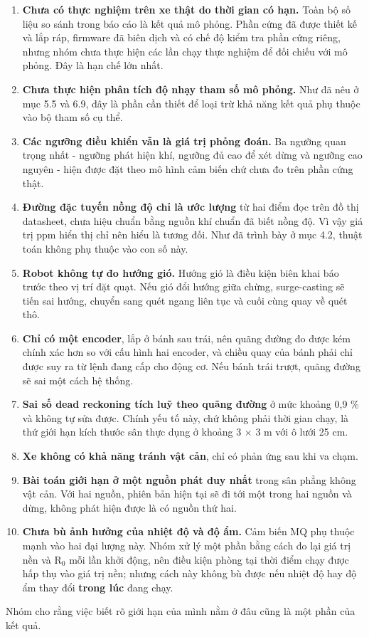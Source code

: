 \begin{enumerate}[leftmargin=1.6em,itemsep=0.15em,topsep=0.3em]
  \item \textbf{Chưa có thực nghiệm trên xe thật do thời gian có hạn.} Toàn bộ số liệu so sánh trong báo cáo là kết quả mô phỏng. Phần cứng đã được thiết kế và lắp ráp, firmware đã biên dịch và có chế độ kiểm tra phần cứng riêng, nhưng nhóm chưa thực hiện các lần chạy thực nghiệm để đối chiếu với mô phỏng. Đây là hạn chế lớn nhất.
  \item \textbf{Chưa thực hiện phân tích độ nhạy tham số mô phỏng.} Như đã nêu ở mục 5.5 và 6.9, đây là phần cần thiết để loại trừ khả năng kết quả phụ thuộc vào bộ tham số cụ thể.
  \item \textbf{Các ngưỡng điều khiển vẫn là giá trị phỏng đoán.} Ba ngưỡng quan trọng nhất - ngưỡng phát hiện khí, ngưỡng đủ cao để xét dừng và ngưỡng cao nguyên - hiện được đặt theo mô hình cảm biến chứ chưa đo trên phần cứng thật.
  \item \textbf{Đường đặc tuyến nồng độ chỉ là ước lượng} từ hai điểm đọc trên đồ thị datasheet, chưa hiệu chuẩn bằng nguồn khí chuẩn đã biết nồng độ. Vì vậy giá trị ppm hiển thị chỉ nên hiểu là tương đối. Như đã trình bày ở mục 4.2, thuật toán không phụ thuộc vào con số này.
  \item \textbf{Robot không tự đo hướng gió.} Hướng gió là điều kiện biên khai báo trước theo vị trí đặt quạt. Nếu gió đổi hướng giữa chừng, surge-casting sẽ tiến sai hướng, chuyển sang quét ngang liên tục và cuối cùng quay về quét thô.
  \item \textbf{Chỉ có một encoder}, lắp ở bánh sau trái, nên quãng đường đo được kém chính xác hơn so với cấu hình hai encoder, và chiều quay của bánh phải chỉ được suy ra từ lệnh đang cấp cho động cơ. Nếu bánh trái trượt, quãng đường sẽ sai một cách hệ thống.
  \item \textbf{Sai số dead reckoning tích luỹ theo quãng đường} ở mức khoảng 0,9 \% và không tự sửa được. Chính yếu tố này, chứ không phải thời gian chạy, là thứ giới hạn kích thước sân thực dụng ở khoảng 3 $\times$ 3 m với ô lưới 25 cm.
  \item \textbf{Xe không có khả năng tránh vật cản}, chỉ có phản ứng sau khi va chạm.
  \item \textbf{Bài toán giới hạn ở một nguồn phát duy nhất} trong sân phẳng không vật cản. Với hai nguồn, phiên bản hiện tại sẽ đi tới một trong hai nguồn và dừng, không phát hiện được là có nguồn thứ hai.
  \item \textbf{Chưa bù ảnh hưởng của nhiệt độ và độ ẩm.} Cảm biến MQ phụ thuộc mạnh vào hai đại lượng này. Nhóm xử lý một phần bằng cách đo lại giá trị nền và R$_{0}$ mỗi lần khởi động, nên điều kiện phòng tại thời điểm chạy được hấp thụ vào giá trị nền; nhưng cách này không bù được nếu nhiệt độ hay độ ẩm thay đổi \textbf{trong lúc} đang chạy.
\end{enumerate}
Nhóm cho rằng việc biết rõ giới hạn của mình nằm ở đâu cũng là một phần của kết quả.


